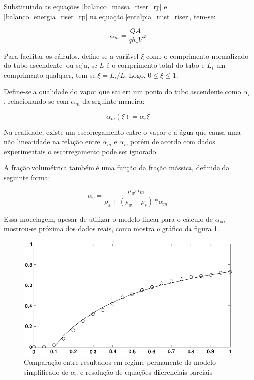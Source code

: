 Substituindo as equações \ref{balanco_massa_riser_rp} e
\ref{balanco_energia_riser_rp} na equação \ref{entalpia_mist_riser},
tem-se:

\begin{equation}
  \alpha_m = \dfrac{Q A}{q h_c V} z
  \label{eq_alfa_m}
\end{equation}

Para facilitar os cálculos, define-se a variável $\xi$ como o
comprimento normalizado do tubo ascendente, ou seja, se $ L $ é o
comprimento total do tubo e $L_i$ um comprimento qualquer, tem-se
$\xi=L_i / L$. Logo, $0 \leq \xi \leq 1$.

Define-se a qualidade do vapor que sai em um ponto do tubo ascendente 
como $\alpha_r$, relacionando-se com $\alpha_m$ da seguinte maneira:

\begin{equation}
  \alpha_m(\xi)=\alpha_r\xi
  \label{alpha_r_m_lin}
\end{equation}

Na realidade, existe um escorregamento entre o vapor e a água que
causa uma não linearidade na relação entre $\alpha_m$ e $\alpha_r$,
porém de acordo com dados experimentais o escorregamento pode ser
ignorado \cite{astrom}.

A fração volumétrica também é uma função da fração mássica, definida
da seguinte forma:

\begin{equation}
  \alpha_v=\dfrac{ \rho_w \alpha_ m}{ \rho_s + (\rho_w - \rho_s) *
    \alpha_m } 
  \label{alpha_v_alpha_m}
\end{equation}

Essa modelagem, apesar de utilizar o modelo linear para o cálculo de
$\alpha_m$, mostrou-se próxima dos dados reais, como mostra o gráfico
da figura \ref{alpha_v_pde_lin}.

\begin{figure}[H]
  \caption{\label{alpha_v_pde_lin} Comparação entre resultados em
    regime permanente do modelo simplificado de $\alpha_v$ e
    resolução de equações diferenciais parciais}
  \begin{center}
    \includegraphics[scale=0.25]{img/alpha_v_pde_lin.png}
  \end{center}
\end{figure}

